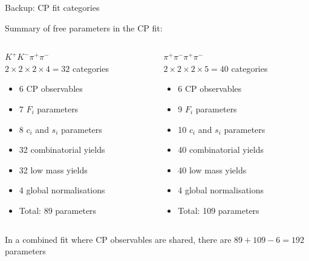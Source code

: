 \documentclass[xcolor={dvipsnames}]{beamer}
\begin{document}
\begin{frame}{Backup: CP fit categories}
  \begin{center}
    {\large Summary of free parameters in the CP fit:}
  \end{center}
  \vspace{-0.5cm}
  \begin{columns}
    \begin{column}{0.5\textwidth}
      \begin{center}
        $K^+K^-\pi^+\pi^-$ \\
        $2\times2\times2\times4 = 32$ categories
      \end{center}
      \begin{itemize}
        \setlength\itemsep{0.0em}
        \item{6 CP observables}
        \item{7 $F_i$ parameters}
        \item{8 $c_i$ and $s_i$ parameters}
        \item{32 combinatorial yields}
        \item{32 low mass yields}
        \item{4 global normalisations}
        \item{Total: 89 parameters}
      \end{itemize}
    \end{column}
    \begin{column}{0.5\textwidth}
      \begin{center}
        $\pi^+\pi^-\pi^+\pi^-$ \\
        $2\times2\times2\times5 = 40$ categories
      \end{center}
      \begin{itemize}
        \setlength\itemsep{0.0em}
        \item{6 CP observables}
        \item{9 $F_i$ parameters}
        \item{10 $c_i$ and $s_i$ parameters}
        \item{40 combinatorial yields}
        \item{40 low mass yields}
        \item{4 global normalisations}
        \item{Total: 109 parameters}
      \end{itemize}
    \end{column}
  \end{columns}
  \vspace{0.3cm}
  \begin{center}
    In a combined fit where CP observables are shared, there are $89 + 109 - 6 = 192$ parameters
  \end{center}
\end{frame}
\end{document}
